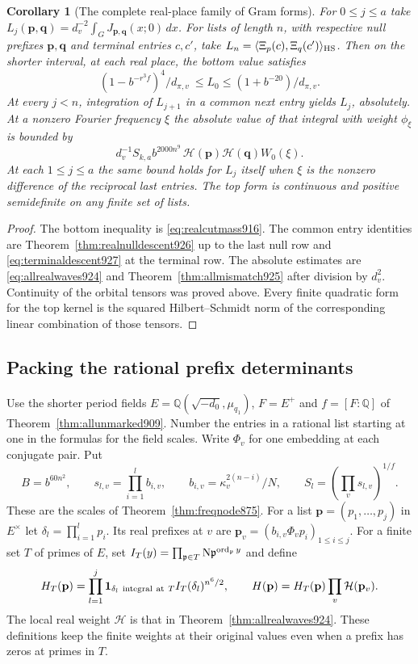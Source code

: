 \documentclass[a4paper,11pt]{article}
\newtheorem{corollary}[proposition]{Corollary}
\theoremstyle{definition}
\theoremstyle{remark}
\numberwithin{equation}{section}
\begin{document}
\begin{corollary}[The complete real-place family of Gram forms]
\leavevmode\label{cor:realsystem927}
For \(0\le j\le a\) take
\(L_j(\mathbf p,\mathbf q)=d_v^{-2}\int_G
J_{\mathbf p,\mathbf q}(x;0)\,dx\). For lists of length \(n\),
with respective null prefixes \(\mathbf p,\mathbf q\) and
terminal entries \(c,c'\), take
\(L_n=\langle\Xi_p(c),\Xi_q(c')\rangle_{\rm HS}\).
Then on the shorter interval, at each real place, the bottom
value satisfies
\[
 (1-b^{-r^3 f})^4/d_{\pi,v}\ \le L_0\le
                       (1+b^{-20})/d_{\pi,v}.
\]
At every \(j<n\), integration of \(L_{j+1}\) in a common next
entry yields \(L_j\), absolutely. At a nonzero Fourier frequency
\(\xi\) the absolute value of that integral with weight
\(\phi_\xi\) is bounded by
\[
     d_v^{-1} S_{k,a} b^{2000n^9}\,
                     \mathcal H(\mathbf p)\mathcal H(\mathbf q)W_0(\xi).
\]
At each \(1\le j\le a\) the same bound holds for \(L_j\) itself
when \(\xi\) is the nonzero difference of the reciprocal last
entries. The top form is continuous and positive semidefinite
on any finite set of lists.
\end{corollary}
\begin{proof}
The bottom inequality is \eqref{eq:realcutmass916}. The common
entry identities are Theorem~\ref{thm:realnulldescent926} up to
the last null row and \eqref{eq:terminaldescent927} at the
terminal row. The absolute estimates are
\eqref{eq:allrealwaves924} and Theorem~\ref{thm:allmismatch925}
after division by \(d_v^2\). Continuity of the orbital tensors
was proved above. Every finite quadratic form for the top
kernel is the squared Hilbert--Schmidt norm of the corresponding
linear combination of those tensors.
\end{proof}
\clearpage

\subsection{Packing the rational prefix determinants}
\label{sec:prefixpack928}

Use the shorter period fields \(E=\mathbb Q(\sqrt{-d_0},\mu_{q_1})\),
\(F=E^+\) and \(f=[F:\mathbb Q]\) of
Theorem~\ref{thm:allunmarked909}. Number the entries in a rational
list starting at one in the formulas for the field scales.
Write \(\Phi_v\) for one embedding at each conjugate pair. Put
\[
 B=b^{60n^2},\qquad
 s_{l,v}=\prod_{i=1}^{l} b_{i,v},\qquad
 b_{i,v}=\kappa_v^{2(n-i)}/N,\qquad
 S_l=\left(\prod_v s_{l,v}\right)^{1/f}.
\]
These are the scales of Theorem~\ref{thm:freqnode875}.
For a list \(\mathbf p=(p_1,\ldots,p_j)\) in \(E^\times\) let
\(\delta_l=\prod_{i=1}^l p_i\). Its real prefixes at \(v\)
are \(\mathbf p_v=(b_{i,v}\Phi_v p_i)_{1\le i\le j}\).
For a finite set \(T\) of primes of \(E\), set
\(I_T(y)=\prod_{\mathfrak p\in T}{\rm N}\mathfrak p^{\operatorname{ord}_{\mathfrak p}y}\)
and define
\[
 H_T(\mathbf p)=\prod_{l=1}^j
    {\boldsymbol 1}_{\delta_l\ {\rm integral\ at}\ T}
                     I_T(\delta_l)^{n^6/2},\qquad
 H(\mathbf p)=H_T(\mathbf p)\prod_v \mathcal H(\mathbf p_v).
\]
The local real weight \(\mathcal H\) is that in
Theorem~\ref{thm:allrealwaves924}. These definitions keep the
finite weights at their original values even when a prefix has
zeros at primes in \(T\).
\end{document}
